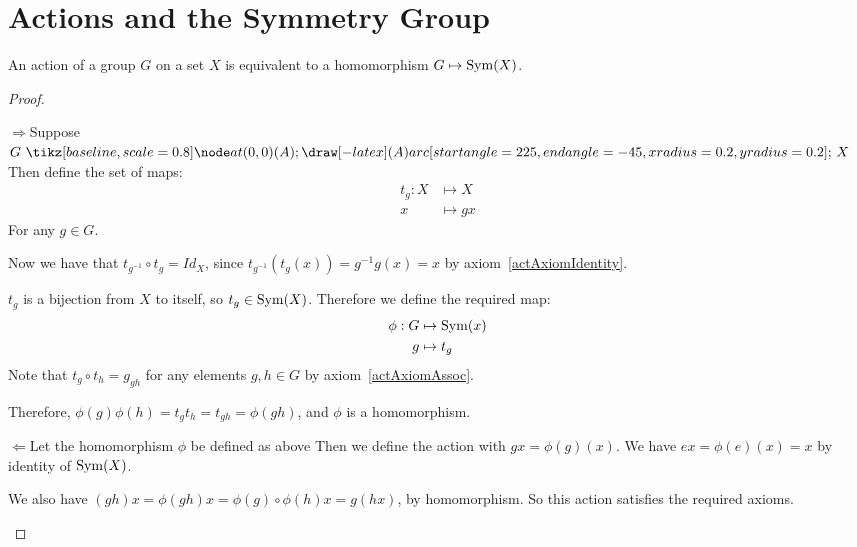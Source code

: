 \documentclass[../Main.tex]{subfiles}
\begin{document}
\section{Actions and the Symmetry Group}
\begin{theorem}
    An action of a group $G$ on a set $X$ is equivalent to a homomorphism $G \mapsto \operatorname{Sym}(X)$.
    \label{thmActionEquivHism}
\end{theorem}
\begin{proof}
    \begin{proofdirection}{$\Rightarrow$}{Suppose $G \actson X$}
        Then define the set of maps:
        \begin{align*}
            t_g : X &\mapsto X \\
            x &\mapsto gx
        \end{align*}        
        For any $g \in G$.\par
        Now we have that $t_{g^{-1}} \circ t_g = Id_X$, since $t_{g^{-1}}(t_g(x)) = g^{-1}g(x) = x$ by axiom~\ref{actAxiomIdentity}.\par
        $t_g$ is a bijection from $X$ to itself, so $t_g \in \operatorname{Sym}(X)$.
        Therefore we define the required map:
        \begin{align*}
            \phi : G &\mapsto \operatorname{Sym}(x) \\
            g &\mapsto t_g
        \end{align*}
        Note that $t_g \circ t_h = g_{gh}$ for any elements $g, h \in G$ by axiom~\ref{actAxiomAssoc}.\par
        Therefore, $\phi(g) \phi(h) = t_g t_h = t_{gh} = \phi(gh)$, and $\phi$ is a homomorphism.
    \end{proofdirection}
    \begin{proofdirection}{$\Leftarrow$}{Let the homomorphism $\phi$ be defined as above}
        Then we define the action with $gx = \phi(g)(x)$.        
        We have $ex = \phi(e)(x) = x$ by identity of $\operatorname{Sym}(X)$.\par
        We also have $(gh)x = \phi(gh)x = \phi(g) \circ \phi(h) x = g(hx)$, by homomorphism.
        So this action satisfies the required axioms.
    \end{proofdirection}
\end{proof}
\end{document}
